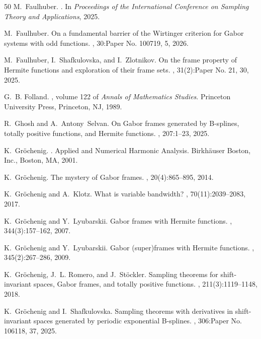 \documentclass[11pt]{amsart}
\numberwithin{equation}{section}
\begin{document}
\begin{thebibliography}{50}
M.~Faulhuber.
.
\newblock In {\em {Proceedings of the International Conference on Sampling Theory and Applications}}, 2025.

M.~Faulhuber.
\newblock On a fundamental barrier of the {W}irtinger criterion for {G}abor systems with odd functions.
, 30:Paper No. 100719, 5, 2026.

M.~Faulhuber, I.~Shafkulovska, and I.~Zlotnikov.
\newblock On the frame property of {H}ermite functions and exploration of their frame sets.
, 31(2):Paper No. 21, 30, 2025.

G.~B. Folland.
, volume 122 of {\em Annals of Mathematics Studies}.
\newblock Princeton University Press, Princeton, NJ, 1989.

R.~Ghosh and A.~Antony~Selvan.
\newblock On {G}abor frames generated by {B}-splines, totally positive functions, and {H}ermite functions.
, 207:1--23, 2025.

K.~Gr\"ochenig.
.
\newblock Applied and Numerical Harmonic Analysis. Birkh\"auser Boston, Inc., Boston, MA, 2001.

K.~Gr\"ochenig.
\newblock The mystery of {G}abor frames.
, 20(4):865--895, 2014.

K.~Gr\"ochenig and A.~Klotz.
\newblock What is variable bandwidth?
, 70(11):2039--2083, 2017.

K.~Gr\"{o}chenig and Y.~Lyubarskii.
\newblock Gabor frames with {H}ermite functions.
, 344(3):157--162, 2007.

K.~Gr\"{o}chenig and Y.~Lyubarskii.
\newblock Gabor (super)frames with {H}ermite functions.
, 345(2):267--286, 2009.

K.~Gr\"ochenig, J.~L. Romero, and J.~St\"ockler.
\newblock Sampling theorems for shift-invariant spaces, {G}abor frames, and totally positive functions.
, 211(3):1119--1148, 2018.

K.~Gr\"ochenig and I.~Shafkulovska.
\newblock Sampling theorems with derivatives in shift-invariant spaces generated by periodic exponential {B}-splines.
, 306:Paper No. 106118, 37, 2025.


\end{thebibliography}
\end{document}
